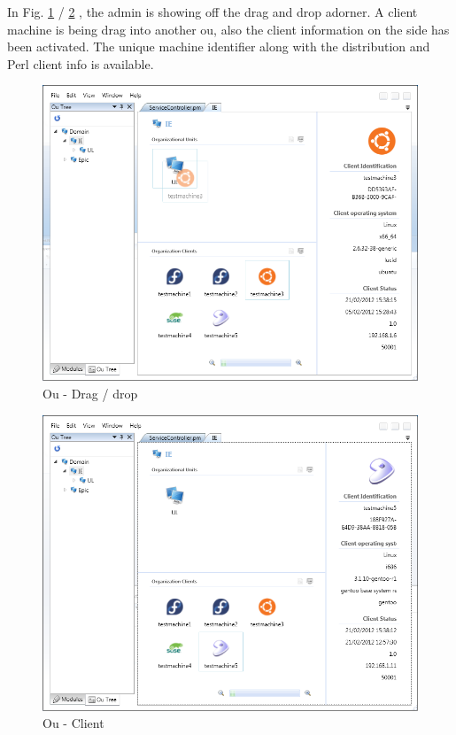 	\normalsize
	{
		In Fig. \ref{fig:SSouDragDRop} / \ref{fig:SSClient} , the admin is showing off the drag and drop adorner.  
		A client machine is being drag into another ou, also the client information on the side has been activated.
		The unique machine identifier along with the distribution and Perl client info is available.
		\newline			
	}		

	\begin{figure}[h!]
		\centering
		\includegraphics[scale=0.60]{pages/appendix3/figures/lgpscreens/ou-dragdrop-adorner.png}
		\caption{Ou - Drag / drop}
		\label{fig:SSouDragDRop}
	\end{figure}
	
	\begin{figure}[h!]
		\centering
		\includegraphics[scale=0.60]{pages/appendix3/figures/lgpscreens/ou-explorer-client.png}
		\caption{Ou - Client}
		\label{fig:SSClient}
	\end{figure}
	
